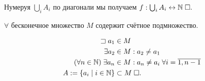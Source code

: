 \documentclass{article}
\begin{document}
Нумеруя $\bigcup_i A_i$ по диагонали мы получаем $f:\bigcup_i A_i\leftrightarrow\mathbb{N}\;\square.$

\pagebreak

\theorem

$\forall$ бесконечное множество $M$ содержит счётное подмножество.

\proof
\begin{align*}
	\sqsupset a_1                 & \in M                                           \\
	\exists a_2                   & \in M:a_2\neq a_1                               \\
	(\forall n\in\mathbb{N})\;\exists a_n & \in M: a_n \neq a_i\;\forall i=\overline{1,n-1} \\
	A:=\{a_i\;|\;i\in\mathbb{N}\}       & \subset M\;\square.                                   \\
\end{align*}
\end{document}
